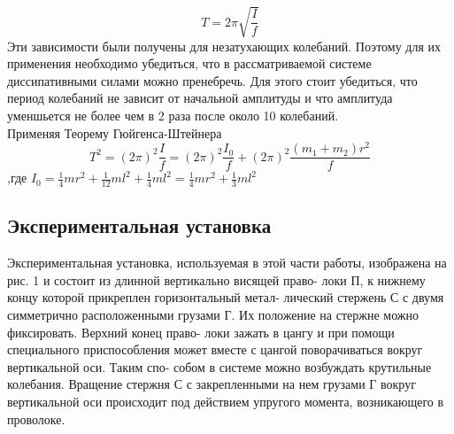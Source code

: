 \documentclass[a4paper]{article}
\begin{document}
\begin{equation}
    T = 2\pi\sqrt{\frac{I}{f}}
\end{equation}
Эти зависимости были получены для незатухающих колебаний. Поэтому для их применения необходимо убедиться, что в рассматриваемой системе диссипативными силами можно пренебречь. Для этого стоит убедиться, что период колебаний не зависит от начальной амплитуды и что амплитуда уменшьется не более чем в 2 раза после около 10 колебаний.\\
Применяя Теорему Гюйгенса-Штейнера
\begin{equation}
    T^2 = (2\pi)^2\frac{I}{f} = (2\pi)^2\frac{I_{0}}{f} + (2\pi)^2\frac{(m_{1}+m_{2})r^2}{f}
\end{equation}
,где $I_{0} = \frac{1}{4}mr^2 + \frac{1}{12}ml^2 + \frac{1}{4}ml^2 = \frac{1}{4}mr^2 + \frac{1}{3}ml^2$

\subsection{Экспериментальная установка}

Экспериментальная установка, используемая в этой части работы,
изображена на рис. 1 и состоит из длинной вертикально висящей право-
локи П, к нижнему концу которой прикреплен горизонтальный метал-
лический стержень С с двумя симметрично расположенными грузами
Г. Их положение на стержне можно фиксировать. Верхний конец право-
локи зажать в цангу и при помощи специального приспособления может
вместе с цангой поворачиваться вокруг вертикальной оси. Таким спо-
собом в системе можно возбуждать крутильные колебания. Вращение
стержня С с закрепленными на нем грузами Г вокруг вертикальной
оси происходит под действием упругого момента, возникающего в проволоке.
\end{document}

